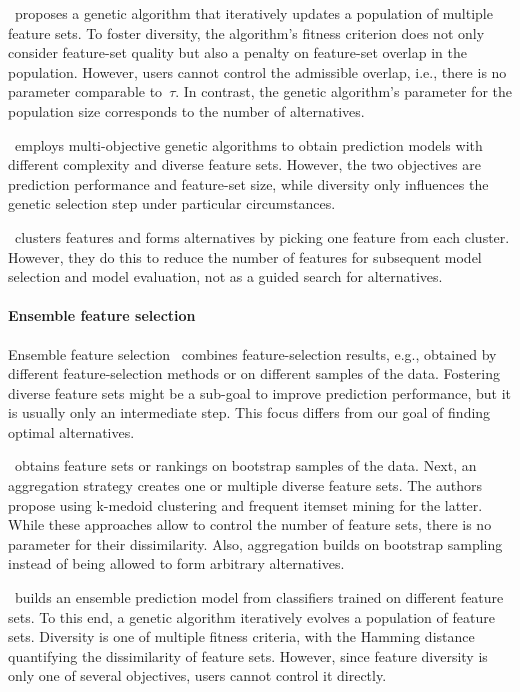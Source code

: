 \documentclass{article}
\theoremstyle{definition}
\begin{document}
\cite{siddiqi2020genetic}~proposes a genetic algorithm that iteratively updates a population of multiple feature sets.
To foster diversity, the algorithm's fitness criterion does not only consider feature-set quality but also a penalty on feature-set overlap in the population.
However, users cannot control the admissible overlap, i.e., there is no parameter comparable to~$\tau$.
In contrast, the genetic algorithm's parameter for the population size corresponds to the number of alternatives.

\cite{emmanouilidis1999selecting}~employs multi-objective genetic algorithms to obtain prediction models with different complexity and diverse feature sets.
However, the two objectives are prediction performance and feature-set size, while diversity only influences the genetic selection step under particular circumstances.

\cite{mueller2021feature}~clusters features and forms alternatives by picking one feature from each cluster.
However, they do this to reduce the number of features for subsequent model selection and model evaluation, not as a guided search for alternatives.

\paragraph{Ensemble feature selection}

Ensemble feature selection~\cite{saeys2008robust, seijo2017ensemble} combines feature-selection results, e.g., obtained by different feature-selection methods or on different samples of the data.
Fostering diverse feature sets might be a sub-goal to improve prediction performance, but it is usually only an intermediate step.
This focus differs from our goal of finding optimal alternatives.

\cite{woznica2012model}~obtains feature sets or rankings on bootstrap samples of the data.
Next, an aggregation strategy creates one or multiple diverse feature sets.
The authors propose using k-medoid clustering and frequent itemset mining for the latter.
While these approaches allow to control the number of feature sets, there is no parameter for their dissimilarity.
Also, aggregation builds on bootstrap sampling instead of being allowed to form arbitrary alternatives.

\cite{liu2019subspace}~builds an ensemble prediction model from classifiers trained on different feature sets.
To this end, a genetic algorithm iteratively evolves a population of feature sets.
Diversity is one of multiple fitness criteria, with the Hamming distance quantifying the dissimilarity of feature sets.
However, since feature diversity is only one of several objectives, users cannot control it directly.
\end{document}
